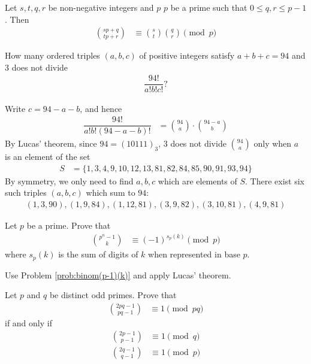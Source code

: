 \begin{corollary}\label{cor:lucas}
	Let $s,t,q,r$ be non-negative integers and $p$ $p$ be a prime such that $0 \leq q,r \leq p-1$. Then
		\begin{align*}
			\binom{sp+q}{tp+r}
				& \equiv \binom{s}{t} \binom{q}{r} \pmod p
		\end{align*}
\end{corollary}

\begin{problem}
	How many ordered triples $(a,b,c)$ of positive integers satisfy $a+b+c=94$ and $3$ does not divide
		\begin{align*}
			\dfrac{94!}{a!b!c!}?
		\end{align*}
\end{problem}

\begin{solution}
	Write $c=94-a-b$, and hence
		\begin{align*}
			\dfrac{94!}{a!b!(94 - a - b)!}
				& = \binom{94}{a} \cdot \binom{94 - a}{b}
		\end{align*}
	By Lucas' theorem, since $94=(10111)_3$, $3$ does not divide $\binom{94}{a}$ only when $a$ is an element of the set
		\begin{align*}
		 S
			 	& = \{1, 3, 4, 9, 10, 12, 13, 81, 82, 84, 85, 90, 91, 93, 94\}
		\end{align*}
	By symmetry, we only need to find $a,b,c$ which are elements of $S$. There exist six such triples $(a,b,c)$ which sum to $94$:
		\begin{align*}
			(1,3,90), (1, 9, 84), (1, 12, 81), (3, 9, 82), (3, 10, 81), (4,9,81)
		\end{align*}
\end{solution}

\begin{problem}
	Let $p$ be a prime. Prove that
		\begin{align*}
			\binom{p^n-1}{k}
				& \equiv (-1)^{s_p(k)}\pmod p
		\end{align*}
	where $s_p(k)$ is the sum of digits of $k$ when represented in base $p$.
\end{problem}

\begin{hint}
	Use Problem \ref{prob:binom(p-1)(k)} and apply Lucas' theorem.
\end{hint}

\begin{problem}
	Let $p$ and $q$ be distinct odd primes. Prove that
		\begin{align*}
			\binom{2pq-1}{pq-1}
				& \equiv 1\pmod{pq}
		\end{align*}
	if and only if
		\begin{align*}
			\binom{2p-1}{p-1} &\equiv 1 \pmod q\\
			\binom{2q-1}{q-1} &\equiv 1 \pmod p
		\end{align*}
\end{problem}

